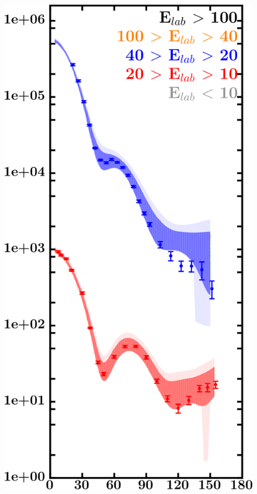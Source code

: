 \documentclass[twocolumn,secnumarabic,amssymb, nobibnotes, aps, prl,
superscriptaddress, nobalancelastpage]{revtex4}
\begin{document}
\begin{figure}[!htb]
\begin{minipage}{0.45\textwidth}
        \includegraphics[width=\textwidth]{figures/o18_neutronElastic.png}
        \label{DOM_o18_neutron_elastic}
    \end{minipage}
    \centering
    \begin{minipage}{0.45\textwidth}
        \centering

\end{minipage}
\end{figure}
\end{document}
